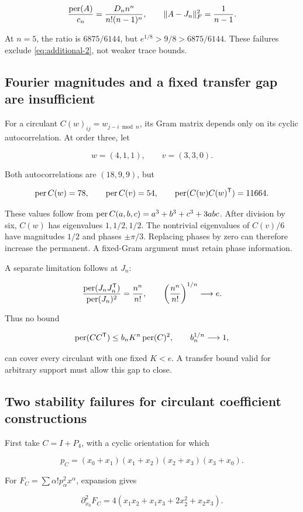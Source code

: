 \[
\frac{\operatorname{per}(A)}{c_n}
=\frac{D_n n^n}{n!(n-1)^n},\qquad
\|A-J_n\|_F^2=\frac1{n-1}.
\]

At \(n=5\), the ratio is \(6875/6144\), but \(e^{1/8}>9/8>6875/6144\). These failures exclude \eqref{eq:additional-2}, not weaker trace bounds.

\subsection{Fourier magnitudes and a fixed transfer gap are insufficient}\label{app:additional-7}

For a circulant \(C(w)_{ij}=w_{j-i\bmod n}\), its Gram matrix depends only on its cyclic autocorrelation. At order three, let

\[
w=(4,1,1),\qquad v=(3,3,0).
\]

Both autocorrelations are \((18,9,9)\), but

\[
\operatorname{per} C(w)=78,\qquad
\operatorname{per} C(v)=54,\qquad
\operatorname{per}(C(w)C(w)^{\mathsf{T}})=11664.
\]

These values follow from \(\operatorname{per} C(a,b,c)=a^3+b^3+c^3+3abc\). After division by six, \(C(w)\) has eigenvalues \(1,1/2,1/2\). The nontrivial eigenvalues of \(C(v)/6\) have magnitudes \(1/2\) and phases \(\pm\pi/3\). Replacing phases by zero can therefore increase the permanent. A fixed-Gram argument must retain phase information.

A separate limitation follows at \(J_n\):

\[
\frac{\operatorname{per}(J_nJ_n^{\mathsf{T}})}{\operatorname{per}(J_n)^2}
=\frac{n^n}{n!},\qquad
\left(\frac{n^n}{n!}\right)^{1/n}\longrightarrow e.
\]

Thus no bound

\[
\operatorname{per}(CC^{\mathsf{T}})\le b_nK^n\operatorname{per}(C)^2,
\qquad b_n^{1/n}\longrightarrow1,
\]

can cover every circulant with one fixed \(K<e\). A transfer bound valid for arbitrary support must allow this gap to close.

\subsection{Two stability failures for circulant coefficient constructions}\label{app:additional-8}

First take \(C=I+P_4\), with a cyclic orientation for which

\[
p_C=(x_0+x_1)(x_1+x_2)(x_2+x_3)(x_3+x_0).
\]

For \(F_C=\sum\alpha!p_\alpha^2x^\alpha\), expansion gives

\[
\partial_{x_0}^2F_C
=4(x_1x_2+x_1x_3+2x_2^2+x_2x_3).
\]

